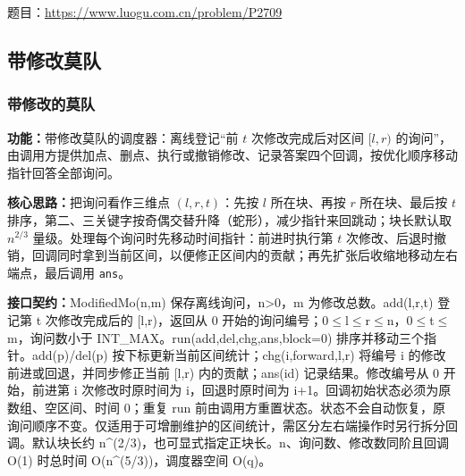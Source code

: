 题目：\url{https://www.luogu.com.cn/problem/P2709}



\Needspace{180pt}

\subsection{带修改莫队}

\subsubsection{带修改的莫队}\label{compact-ModifiedMo}

\noindent\textbf{功能：}\allowbreak 带修改莫队的调度器：离线登记“前 $t$ 次修改完成后对区间 $[l,r)$ 的询问”，由调用方提供加点、删点、执行或撤销修改、记录答案四个回调，按优化顺序移动指针回答全部询问。

\textbf{核心思路：}\allowbreak 把询问看作三维点 $(l,r,t)$：先按 $l$ 所在块、再按 $r$ 所在块、最后按 $t$ 排序，第二、三关键字按奇偶交替升降（蛇形），减少指针来回跳动；块长默认取 $n^{2/3}$ 量级。处理每个询问时先移动时间指针：前进时执行第 $t$ 次修改、后退时撤销，回调同时拿到当前区间，以便修正区间内的贡献；再先扩张后收缩地移动左右端点，最后调用 \texttt{ans}。



{\sloppy{}\noindent\textbf{接口契约：}ModifiedMo(n,m) 保存离线询问，n>0，m 为修改总数。add(l,r,t) 登记第 t 次修改完成后的 [l,r)，返回从 0 开始的询问编号；0$\le$l$\le$r$\le$n，0$\le$t$\le$m，询问数小于 INT\_MAX。run(add,del,chg,ans,block=0) 排序并移动三个指针。add(p)/del(p) 按下标更新当前区间统计；chg(i,forward,l,r) 将编号 i 的修改前进或回退，并同步修正当前 [l,r) 内的贡献；ans(id) 记录结果。修改编号从 0 开始，前进第 i 次修改时原时间为 i，回退时原时间为 i+1。回调初始状态必须为原数组、空区间、时间 0；重复 run 前由调用方重置状态。状态不会自动恢复，原询问顺序不变。仅适用于可增删维护的区间统计，需区分左右端操作时另行拆分回调。默认块长约 n\textasciicircum{}(2/3)，也可显式指定正块长。n、询问数、修改数同阶且回调 O(1) 时总时间 O(n\textasciicircum{}(5/3))，调度器空间 O(q)。\par}

\Needspace{307pt}



\newpage



